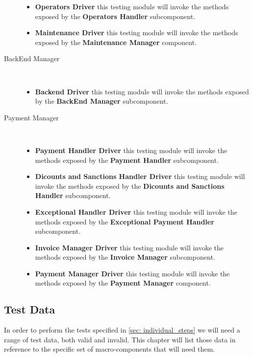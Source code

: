 \begin{description}
\begin{itemize}
				\item \textbf{Operators Driver} this testing module will invoke the methods exposed by the \textbf{Operators Handler} subcomponent.
				\item \textbf{Maintenance Driver} this testing module will invoke the methods exposed by the \textbf{Maintenance Manager} component.
			\end{itemize}	
		\item[BackEnd Manager]~\\
			\begin{itemize}
				\item \textbf{Backend Driver} this testing module will invoke the methods exposed by the \textbf{BackEnd Manager} subcomponent.
			\end{itemize}
		\item[Payment Manager]~\\ 
			\begin{itemize}
				\item \textbf{Payment Handler Driver} this testing module will invoke the methods exposed by the \textbf{Payment Handler} subcomponent.
				\item \textbf{Dicounts and Sanctions Handler Driver} this testing module will invoke the methods exposed by the \textbf{Dicounts and Sanctions Handler} subcomponent.
				\item \textbf{Exceptional Handler Driver} this testing module will invoke the methods exposed by the \textbf{Exceptional Payment Handler} subcomponent.
				\item \textbf{Invoice Manager Driver} this testing module will invoke the methods exposed by the \textbf{Invoice Manager} subcomponent.
				\item \textbf{Payment Manager Driver} this testing module will invoke the methods exposed by the \textbf{Payment Manager} component.
			\end{itemize}
		
		\end{description}
		
	
	
	
	\subsection{Test Data}
	
	In order to perform the tests specified in \autoref{sec: individual_steps} we will need a range of test data, both valid and invalid. This chapter will list those data in reference to the specific set of macro-components that will need them.
	
